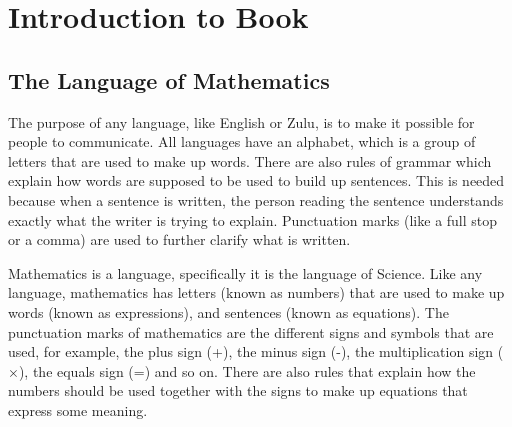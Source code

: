 \chapter{Introduction to Book}
\label{mathintro}

\section{The Language of Mathematics}
The purpose of any language, like English or Zulu, is to make it possible for people to communicate. All languages have an alphabet, which is a group of letters that are used to make up words. There are also rules of grammar which explain how words are supposed to be used to build up sentences. This is needed because when a sentence is written, the person reading the sentence understands exactly what the writer is trying to explain. Punctuation marks (like a full stop or a comma) are used to further clarify what is written.

Mathematics is a language, specifically it is the language of Science. Like any language, mathematics has letters (known as numbers) that are used to make up words (known as expressions), and sentences (known as equations). The punctuation marks of mathematics are the different signs and symbols that are used, for example, the plus sign (+), the minus sign (-), the multiplication sign ($\times$), the equals sign (=) and so on. There are also rules that explain how the numbers should be used together with the signs to make up equations that express some meaning.




